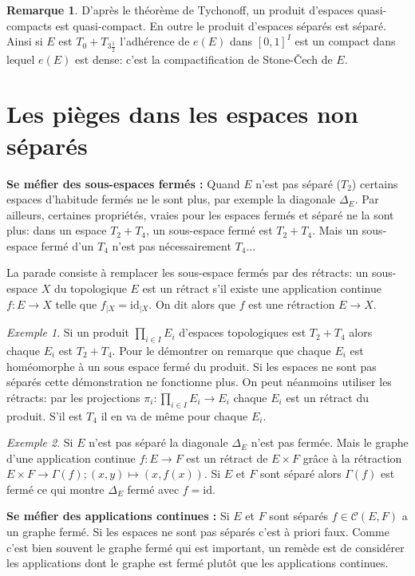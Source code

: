 \documentclass[a4paper, 11pt, french]{book}
\theoremstyle{plain} %
\theoremstyle{definition} %
\newtheorem{remarque}{Remarque}
\theoremstyle{remark} %
\newtheorem{exemple}{Exemple}
\newcommand{\1}{\mathds{1}}
\newcommand{\id}{\mathrm{id}}
\renewcommand{\cal}[1]{\mathcal{#1}}
\begin{document}
\begin{remarque}
	D'après le théorème de Tychonoff, un produit d'espaces quasi-compacts est quasi-compact.
	En outre le produit d'espaces séparés est séparé.
	Ainsi si $E$ est $T_0+T_{3\frac{1}{2}}$ l'adhérence de $e(E)$ dans $[0, 1]^I$ est un compact dans lequel $e(E)$ est dense: c'est la compactification de Stone-Čech de $E$.
\end{remarque}


\section{Les pièges dans les espaces non séparés}

\textbf{Se méfier des sous-espaces fermés :}
Quand $E$ n'est pas séparé ($T_2$) certains espaces d'habitude fermés ne le sont plus, par exemple la diagonale $\Delta_E$.
Par ailleurs, certaines propriétés, vraies pour les espaces fermés et séparé ne la sont plus: dans un espace $T_2+T_4$, un sous-espace fermé est $T_2+T_4$.
Mais un sous-espace fermé d'un $T_4$ n'est pas nécessairement $T_4$...

La parade consiste à remplacer les sous-espace fermés par des rétracts: un sous-espace $X$ du topologique $E$ est un rétract s'il existe une application continue $f:E\rightarrow X$ telle que $f_{\vert X}=\id_{\vert X}$.
On dit alors que $f$ est une rétraction $E\rightarrow X$.

\begin{exemple}
	Si un produit $\prod_{i\in I}E_i$ d'espaces topologiques est $T_2+T_4$ alors chaque $E_i$ est $T_2+T_4$.
	Pour le démontrer on remarque que chaque $E_i$ est homéomorphe à un sous espace fermé du produit.
	Si les espaces ne sont pas séparés cette démonstration ne fonctionne plus.
	On peut néanmoins utiliser les rétracts: par les projections $\pi_i:\prod_{i\in I}E_i\rightarrow E_i$ chaque $E_i$ est un rétract du produit.
	S'il est $T_4$ il en va de même pour chaque $E_i$.
\end{exemple}


\begin{exemple}
	Si $E$ n'est pas séparé la diagonale $\Delta_E$ n'est pas fermée.
	Mais le graphe d'une application continue $f\colon E\rightarrow F$ est un rétract de $E\times F$ grâce à la rétraction $E\times F\rightarrow\Gamma(f); (x, y)\mapsto(x, f(x))$.
	Si $E$ et $F$ sont séparé alors $\Gamma(f)$ est fermé ce qui montre $\Delta_E$ fermé avec $f=\id$.
\end{exemple}

\textbf{Se méfier des applications continues :}
Si $E$ et $F$ sont séparés $f\in\cal{C}(E, F)$ a un graphe fermé.
Si les espaces ne sont pas séparés c'est à priori faux.
Comme c'est bien souvent le graphe fermé qui est important, un remède est de considérer les applications dont le graphe est fermé plutôt que les applications continues.
\end{document}
